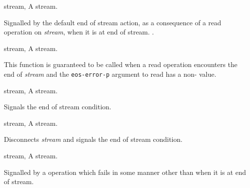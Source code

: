 \begin{optDefinition}
\begin{initoptions}
    \item[stream, \classref{stream}] A stream.
\end{initoptions}
%
\remarks%
Signalled by the default end of stream action, as a consequence of a
read operation on {\em stream\/}, when it is at end of stream.
%
\seealso%
.

\begin{genericargs}
    \item[stream, \classref{buffered-stream}] A stream.
\end{genericargs}
%
\remarks%
This function is guaranteed to be called when a read operation
encounters the end of {\em stream\/} and the {\tt eos-error-p} argument to read
has a non-\nil{}\/ value.

\begin{specargs}
    \item[stream, \classref{buffered-stream}] A stream.
\end{specargs}
%
\remarks%
Signals the end of stream condition.

\begin{specargs}
    \item[stream, \classref{file-stream}] A stream.
\end{specargs}
%
\remarks%
Disconnects {\em stream\/} and signals the end of stream condition.


%
\begin{genericargs}
    \item[stream, \classref{stream}] A stream.
\end{genericargs}
%
\remarks%
Signalled by a  operation which fails in some manner other
than when it is at end of stream.


\end{optDefinition}
